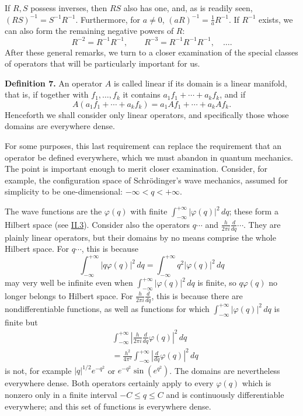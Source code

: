 \documentclass[fontsize=13pt,twoside,openany,headings=normal,parskip=false,bookmarkpackage=false,DIV=calc]{scrbook}
\begin{document}
If $R,S$ possess inverses, then $RS$ also has one, and, as is readily seen, $(RS)^{-1}=S^{-1}R^{-1}$. Furthermore, for $a\ne0$, $(aR)^{-1}=\frac1a R^{-1}$. If $R^{-1}$ exists, we can also form the remaining negative powers of $R$:
\[
R^{-2}=R^{-1}R^{-1},\qquad R^{-3}=R^{-1}R^{-1}R^{-1},\quad\ldots.
\]
After these general remarks, we turn to a closer examination of the special classes of operators that will be particularly important for us.

\leavevmode{}\textbf{Definition 7.}\label{def:II.7} An operator $A$ is called linear if its domain is a linear manifold, that is, if together with $f_1,\ldots,f_k$ it contains $a_1f_1+\cdots+a_kf_k$, and if
\[
A(a_1f_1+\cdots+a_kf_k)=a_1Af_1+\cdots+a_kAf_k.
\]
Henceforth we shall consider only linear operators, and specifically those whose domains are everywhere dense.

For some purposes, this last requirement can replace the requirement that an operator be defined everywhere, which we must abandon in quantum mechanics. The point is important enough to merit closer examination. Consider, for example, the configuration space of Schr\"odinger's wave mechanics, assumed for simplicity to be one-dimensional: $-\infty<q<+\infty$.

\hypertarget{origpage-48}{}%
The wave functions are the $\varphi(q)$ with finite $\int_{-\infty}^{+\infty}|\varphi(q)|^2\,dq$; these form a Hilbert space (see \hyperref[sec:II.3]{II.3}). Consider also the operators $q\cdots$ and $\frac{h}{2\pi i}\frac{d}{dq}\cdots$. They are plainly linear operators, but their domains by no means comprise the whole Hilbert space. For $q\cdots$, this is because
\[
\int_{-\infty}^{+\infty}|q\varphi(q)|^2\,dq=\int_{-\infty}^{+\infty}q^2|\varphi(q)|^2\,dq
\]
may very well be infinite even when $\int_{-\infty}^{+\infty}|\varphi(q)|^2\,dq$ is finite, so $q\varphi(q)$ no longer belongs to Hilbert space. For $\frac{h}{2\pi i}\frac{d}{dq}$, this is because there are nondifferentiable functions, as well as functions for which $\int_{-\infty}^{+\infty}|\varphi(q)|^2\,dq$ is finite but
\begin{align*}
&\int_{-\infty}^{+\infty}\left|\frac{h}{2\pi i}\frac{d}{dq}\varphi(q)\right|^2\,dq\\
&=\frac{h^2}{4\pi^2}\int_{-\infty}^{+\infty}\left|\frac{d}{dq}\varphi(q)\right|^2\,dq
\end{align*}
is not, for example $|q|^{1/2}e^{-q^2}$ or $e^{-q^2}\sin(e^{q^2})$. The domains are nevertheless everywhere dense. Both operators certainly apply to every $\varphi(q)$ which is nonzero only in a finite interval $-C\leq q\leq C$ and is continuously differentiable everywhere; and this set of functions is everywhere dense.
\end{document}
